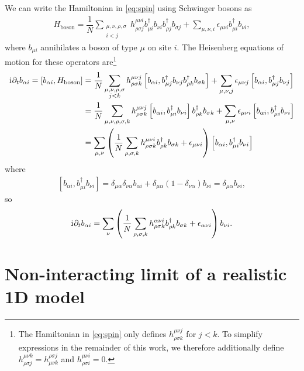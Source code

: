 \documentclass[nofootinbib,notitlepage,11pt]{revtex4-2}
\renewcommand{\t}{\text} %
\newcommand{\f}[2]{\dfrac{#1}{#2}} %
\newcommand{\p}[1]{\left(#1\right)} %
\renewcommand{\sp}[1]{\left[#1\right]} %
\renewcommand{\d}{\partial} %
\renewcommand{\i}{\mathrm{i}\mkern1mu} %
\newcommand{\1}{\mathds{1}}
\begin{document}
We can write the Hamiltonian in \eqref{eq:spin} using Schwinger bosons
as
\begin{align}
  H_{\t{boson}} = \f1N \sum_{\substack{\mu,\nu,\rho,\sigma\\i<j}}
  h^{\mu\nu i}_{\rho\sigma j}
  b_{\mu i}^\dag b_{\nu i} b_{\rho j}^\dag b_{\sigma j}
  + \sum_{\mu,\nu,i} \epsilon_{\mu\nu i} b_{\mu i}^\dag b_{\nu i},
\end{align}
where $b_{\mu i}$ annihilates a boson of type $\mu$ on site $i$.  The
Heisenberg equations of motion for these operators are\footnote{The
  Hamiltonian in \eqref{eq:spin} only defines
  $h^{\mu\nu j}_{\rho\sigma k}$ for $j<k$.  To simplify expressions in
  the remainder of this work, we therefore additionally define
  $h^{\mu\nu k}_{\rho\sigma j}=h^{\rho\sigma j}_{\mu\nu k}$ and
  $h^{\mu\nu i}_{\rho\sigma i}=0$.}
\begin{align}
  \i \d_t b_{\alpha i} = \sp{b_{\alpha i}, H_{\t{boson}}}
  &= \f1N \sum_{\substack{\mu,\nu,\rho,\sigma\\j<k}}
  h^{\mu\nu j}_{\rho\sigma k}
  \sp{b_{\alpha i}, b_{\mu j}^\dag b_{\nu j} b_{\rho k}^\dag b_{\sigma k}}
  + \sum_{\mu,\nu,j} \epsilon_{\mu\nu j}
  \sp{b_{\alpha i}, b_{\mu j}^\dag b_{\nu j}} \\
  &= \f1N \sum_{\mu,\nu,\rho,\sigma,k}
  h^{\mu\nu j}_{\rho\sigma k}
  \sp{b_{\alpha i}, b_{\mu i}^\dag b_{\nu i}} b_{\rho k}^\dag b_{\sigma k}
  + \sum_{\mu,\nu} \epsilon_{\mu\nu i}
  \sp{b_{\alpha i}, b_{\mu i}^\dag b_{\nu i}} \\
  &= \sum_{\mu,\nu} \p{\f1N \sum_{\rho,\sigma,k}
    h^{\mu\nu i}_{\rho\sigma k} b_{\rho k}^\dag b_{\sigma k}
    + \epsilon_{\mu\nu i}}
  \sp{b_{\alpha i}, b_{\mu i}^\dag b_{\nu i}}
\end{align}
where
\begin{align}
  \sp{b_{\alpha i}, b_{\mu i}^\dag b_{\nu i}}
  = \delta_{\mu\alpha} \delta_{\nu\alpha} b_{\alpha i}
  + \delta_{\mu\alpha} \p{1-\delta_{\nu\alpha}} b_{\nu i}
  = \delta_{\mu\alpha} b_{\nu i},
\end{align}
so
\begin{align}
  \i \d_t b_{\alpha i}
  = \sum_\nu \p{\f1N \sum_{\rho,\sigma,k}
    h^{\alpha\nu i}_{\rho\sigma k} b_{\rho k}^\dag b_{\sigma k}
    + \epsilon_{\alpha\nu i}} b_{\nu i}.
\end{align}

\section{Non-interacting limit of a realistic 1D model}
\end{document}
